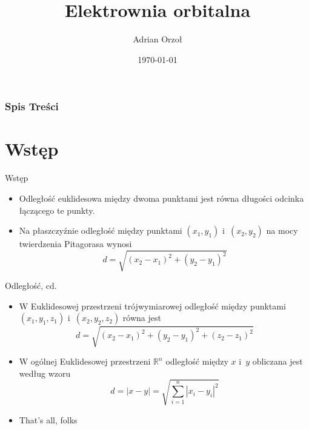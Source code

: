 \documentclass{beamer}
\title{Elektrownia orbitalna}
\author{Adrian Orzoł}
\institute{UWM}
\date{\today}
\begin{document}
\frame{\titlepage}



\begin{frame}
\frametitle{Spis Treści}
\tableofcontents
\end{frame}



\section{Wstęp}
\begin{frame}{Wstęp}
\begin{itemize}
\item{Odległość euklidesowa między dwoma punktami jest równa długości odcinka łączącego te punkty.}
\pause
\item Na płaszczyźnie odległość między punktami $(x_1, y_1)$ i~$(x_2, y_2)$ na mocy twierdzenia Pitagorasa wynosi
$$d=\sqrt{(x_2-x_1)^2+(y_2-y_1)^2}$$
\end{itemize}
\end{frame}

\begin{frame}{Odległość, cd.}
\begin{itemize}
\item<2-3> W Euklidesowej przestrzeni trójwymiarowej odległość między punktami $(x_1, y_1, z_1)$ i~$(x_2, y_2, z_2)$ równa jest
$$d=\sqrt{(x_2-x_1)^2+(y_2-y_1)^2+(z_2-z_1)^2}$$
\item<-3> W ogólnej Euklidesowej  przestrzeni $\mathbb{R}^n$ odległość między $x$ i~$y$ obliczana jest według wzoru
$$d=|x-y|=\sqrt{\sum^n_{i=1}{|x_i-y_i|^2}}$$
\item<4> That's all, folks
\end{itemize}
\end{frame}
\end{document}
